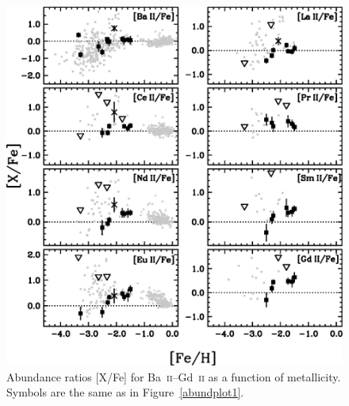\documentclass{emulateapj}
\begin{document}
\begin{figure}
\includegraphics[angle=0,width=7.0in]{fig09.eps}
\caption{
\label{abundplot4}
Abundance ratios [X/Fe] for Ba~\textsc{ii}--Gd~\textsc{ii}
as a function of metallicity.
Symbols are the same as in Figure~\ref{abundplot1}.
}
\end{figure}
\end{document}
